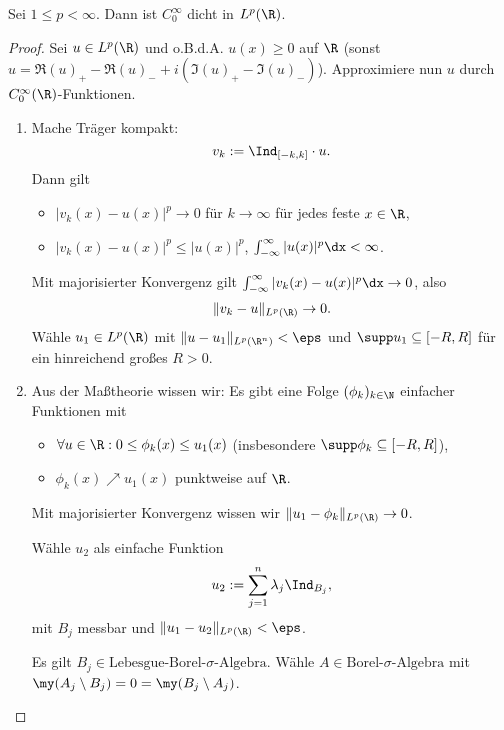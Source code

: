 \begin{st} \label{4.18}
	Sei $1 \le p < \infty$.
	Dann ist $C_0^\infty$ dicht in $L^p(\R)$.
	\begin{proof}
		Sei $u \in L^p(\R)$ und o.B.d.A. $u(x) \ge 0$ auf $\R$ (sonst $u = \Re(u)_+ - \Re(u)_- + i(\Im(u)_+ - \Im(u)_-)$).
		Approximiere nun $u$ durch $C_0^\infty(\R)$-Funktionen.
		\begin{enumerate}[1)]
			\item
				Mache Träger kompakt:
				\[
					v_k := \Ind_{[-k,k]}\cdot u.
				\]
				Dann gilt
				\begin{itemize}
					\item
						$|v_k(x)-u(x)|^p \to 0$ für $k\to \infty$ für jedes feste $x \in \R$,
					\item
						$|v_k(x)-u(x)|^p \le |u(x)|^p$, $\int_{-\infty}^\infty |u(x)|^p \dx < \infty$.
				\end{itemize}
				Mit majorisierter Konvergenz gilt $\int_{-\infty}^\infty |v_k(x) - u(x)|^p \dx \to 0$, also
				\[
					\|v_k - u\|_{L^p(\R)} \to 0.
				\]
				Wähle $u_1 \in L^p(\R)$ mit $\|u-u_1\|_{L^p(\R^n)} < \eps$ und $\supp u_1 \subset [-R,R]$ für ein hinreichend großes $R > 0$.
			\item
				Aus der Maßtheorie wissen wir: Es gibt eine Folge $(\phi_k)_{k\in \N}$ einfacher Funktionen mit
				\begin{itemize}
					\item
						$\forall u \in \R : 0 \le \phi_k(x) \le u_1(x)$ (insbesondere $\supp \phi_k \subset [-R,R]$),
					\item
						$\phi_k(x) \nearrow u_1(x)$ punktweise auf $\R$.
				\end{itemize}
				Mit majorisierter Konvergenz wissen wir $\|u_1 - \phi_k\|_{L^p(\R)} \to 0$.

				Wähle $u_2$ als einfache Funktion
				\[
					u_2 := \sum_{j=1}^n \lambda_j \Ind_{B_j},
				\]
				mit $B_j$ messbar und $\|u_1-u_2\|_{L^p(\R)} < \eps$.

				Es gilt $B_j \in \text{Lebesgue-Borel-$\sigma$-Algebra}$.
				Wähle $A \in \text{Borel-$\sigma$-Algebra}$ mit $\my(A_j \setminus B_j) = 0 = \my(B_j \setminus A_j)$.


\end{enumerate}
\end{proof}
\end{st}
